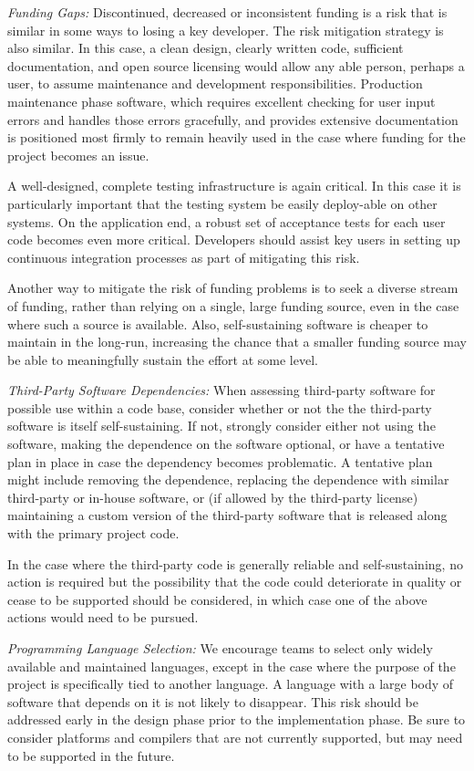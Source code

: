 \documentclass[11pt]{SANDreport}
\begin{document}
{}\textit{Funding Gaps:} Discontinued, decreased or inconsistent
funding is a risk that is similar in some ways to losing a key
developer.  The risk mitigation strategy is also similar.  In this
case, a clean design, clearly written code, sufficient documentation,
and open source licensing would allow any able person, perhaps a user,
to assume maintenance and development responsibilities.  Production
maintenance phase software, which requires excellent checking for user
input errors and handles those errors gracefully, and provides
extensive documentation is positioned most firmly to remain heavily
used in the case where funding for the project becomes an issue.

A well-designed, complete testing infrastructure is again critical.
In this case it is particularly important that the testing system be
easily deploy-able on other systems.  On the application end, a robust
set of acceptance tests for each user code becomes even more critical.
Developers should assist key users in setting up continuous
integration processes as part of mitigating this risk.

Another way to mitigate the risk of funding problems is to seek a diverse
stream of funding, rather than relying on a single, large funding source, even
in the case where such a source is available.  Also, self-sustaining software
is cheaper to maintain in the long-run, increasing the chance that a smaller
funding source may be able to meaningfully sustain the effort at some level.

{}\textit{Third-Party Software Dependencies:} When assessing
third-party software for possible use within a code base, consider
whether or not the the third-party software is itself self-sustaining.
If not, strongly consider either not using the software, making the
dependence on the software optional, or have a tentative plan in place
in case the dependency becomes problematic.  A tentative plan might
include removing the dependence, replacing the dependence with similar
third-party or in-house software, or (if allowed by the third-party
license) maintaining a custom version of the third-party software that
is released along with the primary project code.

In the case where the third-party code is generally reliable and
self-sustaining, no action is required but the possibility that the
code could deteriorate in quality or cease to be supported should be
considered, in which case one of the above actions would need to be
pursued.

{}\textit{Programming Language Selection:} We encourage teams to
select only widely available and maintained languages, except in the
case where the purpose of the project is specifically tied to another
language.  A language with a large body of software that depends on it
is not likely to disappear.  This risk should be addressed early in
the design phase prior to the implementation phase.  Be sure to
consider platforms and compilers that are not currently supported, but
may need to be supported in the future.
\end{document}
